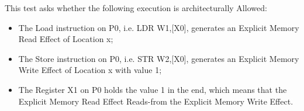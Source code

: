 This test asks whether the following execution is architecturally Allowed:

\begin{itemize}
  \item The Load instruction on P0, i.e. LDR W1,[X0], generates an Explicit Memory Read Effect of Location x;
  \item The Store instruction on P0, i.e. STR W2,[X0], generates an Explicit Memory Write Effect of Location x with value 1;
  \item The Register X1 on P0 holds the value 1 in the end, which means that the Explicit Memory Read Effect Reads-from the Explicit Memory Write Effect.
\end{itemize}
